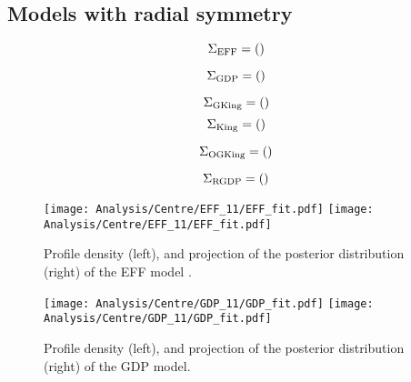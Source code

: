  \subsection{Models with radial symmetry}
 \label{sect:app_radial}
{\tiny
$$
\Sigma_{\rm{EFF}}=
\left(\arraycolsep=1.5pt
\begin{array}{*{10}r}

\end{array}\right)
$$

$$
\Sigma_{\rm{GDP}}=
\left(\arraycolsep=1.5pt
\begin{array}{*{10}r}

\end{array}\right)
$$

$$
\Sigma_{\rm{GKing}}=
\left(\arraycolsep=1.5pt
\begin{array}{*{10}r}

\end{array}\right)
$$
$$
\Sigma_{\rm{King}}=
\left(\arraycolsep=1.5pt
\begin{array}{*{10}r}

\end{array}\right)
$$

$$
\Sigma_{\rm{OGKing}}=
\left(\arraycolsep=1.5pt
\begin{array}{*{10}r}

\end{array}\right)
$$

$$
\Sigma_{\rm{RGDP}}=
\left(\arraycolsep=1.5pt
\begin{array}{*{10}r}

\end{array}\right)
$$
}
\begin {figure}
 \centering
 \texttt{[image: Analysis/Centre/EFF\_11/EFF\_fit.pdf]}
 \texttt{[image: Analysis/Centre/EFF\_11/EFF\_fit.pdf]}
  \caption{Profile density (left), and projection of the posterior distribution (right) of the EFF model .}
\label{fig:EFFctr}
\end {figure}

\begin {figure}
 \centering
 \texttt{[image: Analysis/Centre/GDP\_11/GDP\_fit.pdf]}
 \texttt{[image: Analysis/Centre/GDP\_11/GDP\_fit.pdf]}
  \caption{Profile density (left), and projection of the posterior distribution (right) of the GDP model.}
\label{fig:GDPctr}
\end {figure}


